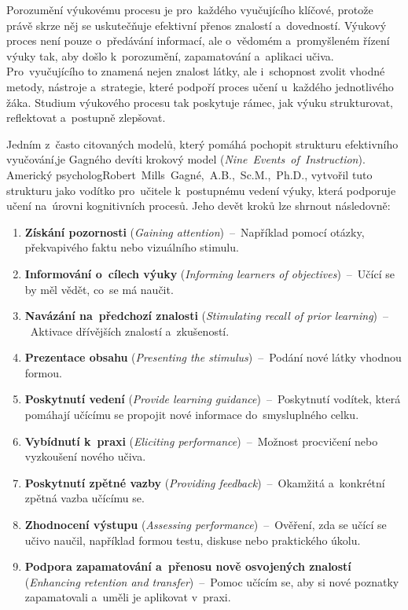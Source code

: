 \documentclass[male,czech,api_bc]{kitheses}
\begin{document}
Porozumění výukovému procesu je pro~každého vyučujícího klíčové, protože právě skrze něj se uskutečňuje efektivní přenos znalostí a~dovedností. Výukový proces není pouze o~předávání informací, ale o~vědomém a~promyšleném řízení výuky tak, aby došlo k~porozumění, zapamatování a~aplikaci učiva. Pro~vyučujícího to znamená nejen znalost látky, ale i~schopnost zvolit vhodné metody, nástroje a~strategie, které podpoří proces učení u~každého jednotlivého žáka. Studium výukového procesu tak poskytuje rámec, jak výuku strukturovat, reflektovat a~postupně zlepšovat.

Jedním z~často citovaných modelů, který pomáhá pochopit strukturu efektivního vyučování,\break je Gagného devíti krokový model (\textit{Nine~Events~of~Instruction}). Americký psycholog\break\mbox{Robert~Mills~Gagné,~A.B.,~Sc.M.,~Ph.D.}, vytvořil tuto strukturu jako vodítko pro~učitele k~postupnému vedení výuky, která podporuje učení na~úrovni kognitivních procesů. Jeho devět kroků lze shrnout následovně:

\begin{enumerate}
	\item \textbf{Získání pozornosti} (\textit{Gaining attention})~--~Například pomocí otázky, překvapivého faktu nebo vizuálního stimulu.
	\item \textbf{Informování o~cílech výuky} (\textit{Informing learners of objectives})~--~Učící se by měl vědět, co~se má naučit.
	\item \textbf{Navázání na~předchozí znalosti} (\textit{Stimulating recall of prior learning})~--~Aktivace dřívějších znalostí a~zkušeností.
	\item \textbf{Prezentace obsahu} (\textit{Presenting the stimulus})~--~Podání nové látky vhodnou formou.
	\item \textbf{Poskytnutí vedení} (\textit{Provide learning guidance})~--~Poskytnutí vodítek, která pomáhají učícímu se propojit nové informace do~smysluplného celku.
	\item \textbf{Vybídnutí k~praxi} (\textit{Eliciting performance})~--~Možnost procvičení nebo vyzkoušení nového učiva.
	\item \textbf{Poskytnutí zpětné vazby} (\textit{Providing feedback})~--~Okamžitá a~konkrétní zpětná vazba učícímu se.
	\item \textbf{Zhodnocení výstupu} (\textit{Assessing performance})~--~Ověření, zda se učící se učivo naučil, například formou testu, diskuse nebo praktického úkolu.
	\item \textbf{Podpora zapamatování a~přenosu nově osvojených znalostí} (\textit{Enhancing retention and transfer})~--~Pomoc učícím se, aby si nové poznatky zapamatovali a~uměli je aplikovat v~praxi.
\end{enumerate}
\end{document}
